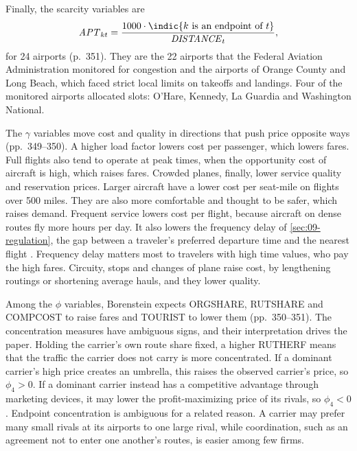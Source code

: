 Finally, the scarcity variables are
\begin{equation}\label{eq:09-bor-apt}
\mathit{APT}_{kt} = \frac{1000 \cdot \indic\{k \text{ is an endpoint of } t\}}{\mathit{DISTANCE}_t} ,
\end{equation}
for 24 airports (p.~351). They are the 22 airports that the Federal Aviation Administration monitored for
congestion and the airports of Orange County and Long Beach, which faced strict local limits on takeoffs and
landings. Four of the monitored airports allocated slots: O'Hare, Kennedy, La Guardia and Washington National.

 The $\gamma$ variables move cost and quality in directions that push price opposite
ways (pp.~349--350). A higher load factor lowers cost per passenger, which lowers fares. Full flights also tend
to operate at peak times, when the opportunity cost of aircraft is high, which raises fares. Crowded planes,
finally, lower service quality and reservation prices. Larger aircraft have a lower cost per seat-mile on
flights over 500 miles. They are also more comfortable and thought to be safer, which raises demand. Frequent
service lowers cost per flight, because aircraft on dense routes fly more hours per day. It also lowers the
frequency delay of \cref{sec:09-regulation}, the gap between a traveler's preferred departure time and the
nearest flight \citep{DouglasMiller1974}. Frequency delay matters most to travelers with high time values, who pay the high
fares. Circuity, stops and changes of plane raise cost, by lengthening routings or shortening average hauls,
and they lower quality.

Among the $\phi$ variables, Borenstein expects ORGSHARE, RUTSHARE and COMPCOST to raise fares and TOURIST to
lower them (pp.~350--351). The concentration measures have ambiguous signs, and their interpretation drives the
paper. Holding the carrier's own route share fixed, a higher RUTHERF means that the traffic the carrier does not
carry is more concentrated. If a dominant carrier's high price creates an umbrella, this raises the observed
carrier's price, so $\phi_4 > 0$. If a dominant carrier instead has a competitive advantage through marketing
devices, it may lower the profit-maximizing price of its rivals, so $\phi_4 < 0$. Endpoint concentration is
ambiguous for a related reason. A carrier may prefer many small rivals at its airports to one large rival,
while coordination, such as an agreement not to enter one another's routes, is easier among few firms.

